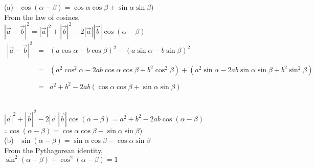 \documentclass[11pt]{article}
\begin{document}
(a)  $ \cos (\alpha - \beta) = \cos\alpha \cos \beta + \sin \alpha \sin \beta) $ \\

From the law of cosines, \\

$
| \vec{a} - \vec{b} |^2 = | \vec{a} |^2 + | \vec{b} |^2 - 2 | \vec{a} | | \vec{b} | \cos (\alpha - \beta) 
$
\\

$
\begin{array}{rcl}
| \vec{a} - \vec{b} |^2  & = & (a \cos \alpha - b \cos \beta)^2 - (a \sin \alpha - b \sin \beta)^2 \\
\\
& = & ( a^2\cos^2\alpha - 2ab \cos\alpha\cos\beta + b^2\cos^2\beta) + (a^2\sin\alpha - 2ab\sin\alpha\sin\beta + b^2\sin^2\beta) \\
\\
& = & a^2 + b^2 - 2ab(\cos\alpha\cos\beta+\sin\alpha\sin\beta)

\end{array}
$

\\

$
|\vec{a}|^2+|\vec{b}|^2-2|\vec{a}||\vec{b}|\cos(\alpha-\beta) = a^2 + b^2 - 2ab\cos(\alpha-\beta)
$
\\

$
\therefore \cos (\alpha - \beta) = \cos\alpha \cos \beta - \sin \alpha \sin \beta)
$
\\

(b)  $ \sin (\alpha - \beta) = \sin\alpha \cos \beta - \cos \alpha \sin \beta $ \\

From the Pythagorean identity, \\

$
\sin^2(\alpha-\beta)+\cos^2(\alpha-\beta) = 1
$
\\ 
\end{document}
